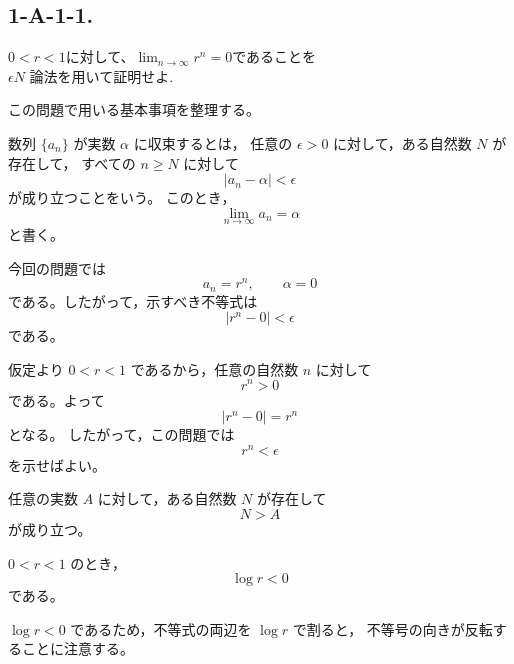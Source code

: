 \subsection{1-A-1-1.}

\begin{exercise}
	$0<r<1$に対して、$\lim_{n\rightarrow\infty}r^n=0$であることを\\$\epsilon N$ 論法を用いて証明せよ.

\end{exercise}

\begin{background}
	この問題で用いる基本事項を整理する。

	\begin{definition}[数列の極限]
		数列 $\{a_n\}$ が実数 $\alpha$ に収束するとは，
		任意の $\epsilon>0$ に対して，ある自然数 $N$ が存在して，
		すべての $n\geq N$ に対して
		\[
			|a_n-\alpha|<\epsilon
		\]
		が成り立つことをいう。
		このとき，
		\[
			\lim_{n\to\infty}a_n=\alpha
		\]
		と書く。
	\end{definition}

	\begin{remark}
		今回の問題では
		\[
			a_n=r^n,\qquad \alpha=0
		\]
		である。したがって，示すべき不等式は
		\[
			|r^n-0|<\epsilon
		\]
		である。
	\end{remark}

	\begin{remark}
		仮定より $0<r<1$ であるから，任意の自然数 $n$ に対して
		\[
			r^n>0
		\]
		である。よって
		\[
			|r^n-0|=r^n
		\]
		となる。
		したがって，この問題では
		\[
			r^n<\epsilon
		\]
		を示せばよい。
	\end{remark}

	\begin{theorem}[アルキメデスの性質]
		任意の実数 $A$ に対して，ある自然数 $N$ が存在して
		\[
			N>A
		\]
		が成り立つ。
	\end{theorem}

	\begin{lemma}
		$0<r<1$ のとき，
		\[
			\log r<0
		\]
		である。
	\end{lemma}

	\begin{remark}
		$\log r<0$ であるため，不等式の両辺を $\log r$ で割ると，
		不等号の向きが反転することに注意する。
	\end{remark}
\end{background}

